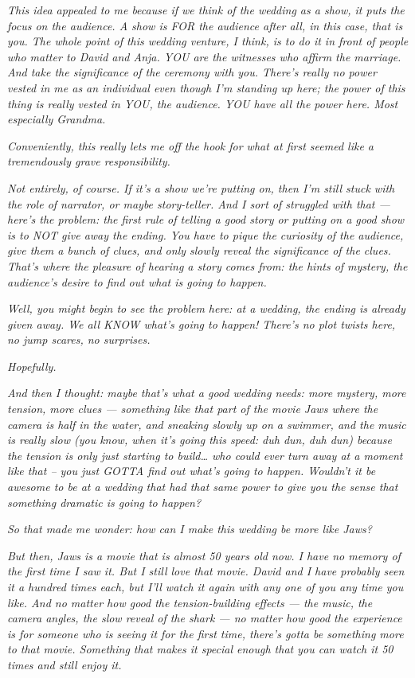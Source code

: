 \emph{This idea appealed to me because if we think of the wedding as a
show, it puts the focus on the audience. A show is FOR the audience
after all, in this case, that is you. The whole point of this wedding
venture, I think, is to do it in front of people who matter to David and
Anja. YOU are the witnesses who affirm the marriage. And take the
significance of the ceremony with you. There's really no power vested in
me as an individual even though I'm standing up here; the power of this
thing is really vested in YOU, the audience. YOU have all the power
here. Most especially Grandma.}

\emph{Conveniently, this really lets me off the hook for what at first
seemed like a tremendously grave responsibility.}

\emph{Not entirely, of course. If it's a show we're putting on, then I'm
still stuck with the role of narrator, or maybe story-teller. And I sort
of struggled with that --- here's the problem: the first rule of telling
a good story or putting on a good show is to NOT give away the ending.
You have to pique the curiosity of the audience, give them a bunch of
clues, and only slowly reveal the significance of the clues. That's
where the pleasure of hearing a story comes from: the hints of mystery,
the audience's desire to find out what is going to happen.}

\emph{Well, you might begin to see the problem here: at a wedding, the
ending is already given away. We all KNOW what's going to happen!
There's no plot twists here, no jump scares, no surprises.}

\emph{Hopefully.}

\emph{And then I thought: maybe that's what a good wedding needs: more
mystery, more tension, more clues --- something like that part of the
movie Jaws where the camera is half in the water, and sneaking slowly up
on a swimmer, and the music is really slow (you know, when it's going
this speed: duh dun, duh dun) because the tension is only just starting
to build\ldots{} who could ever turn away at a moment like that -- you
just GOTTA find out what's going to happen. Wouldn't it be awesome to be
at a wedding that had that same power to give you the sense that
something dramatic is going to happen?}

\emph{So that made me wonder: how can I make this wedding be more like
Jaws?}

\emph{But then, Jaws is a movie that is almost 50 years old now. I have
no memory of the first time I saw it. But I still love that movie. David
and I have probably seen it a hundred times each, but I'll watch it
again with any one of you any time you like. And no matter how good the
tension-building effects --- the music, the camera angles, the slow
reveal of the shark --- no matter how good the experience is for someone
who is seeing it for the first time, there's gotta be something more to
that movie. Something that makes it special enough that you can watch it
50 times and still enjoy it.}

